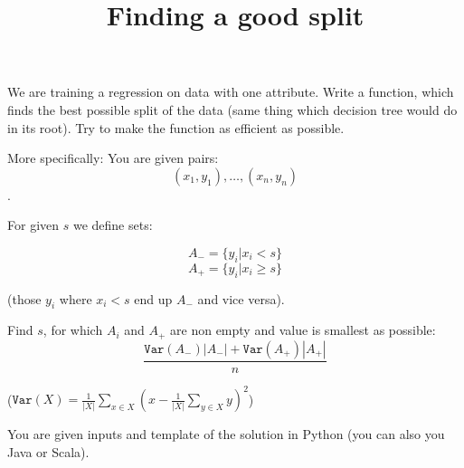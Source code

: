 \documentclass{article}
\begin{document}
\title{Finding a good split}
\maketitle
\def\question#1#2{\item[\bf #1.] [{\it #2 bodov}\/]}

\bigskip

We are training a regression on data with one attribute. Write a function, which
finds the best possible split of the data (same thing which decision tree would do in its root).
Try to make the function as efficient as possible.

\bigskip

More specifically:
You are given pairs:
$$(x_1, y_1), \dots, (x_n, y_n)$$.

For given $s$ we define sets:

$$A_{-} = \{ y_i | x_i < s \}$$
$$A_+ = \{y_i | x_i \geq s\}$$

(those $y_i$ where $x_i < s$ end up $A_-$ and vice versa).


Find $s$, for which $A_i$ and $A_+$ are non empty and value is smallest as possible:
$$\frac{\texttt{Var}(A_-)|A_-| + \texttt{Var}(A_+)|A_+|}{n}$$

($\texttt{Var}(X) = \frac{1}{|X|} \sum_{x \in X} \left (x - \frac{1}{|X|} \sum_{y \in X} y \right )^2$)

\bigskip

You are given inputs and template of the solution in Python (you can also you Java or Scala).
\end{document}
